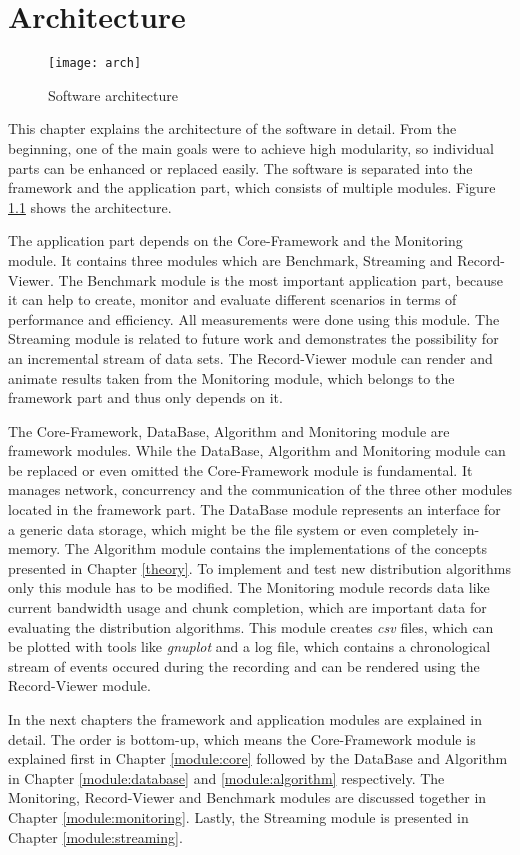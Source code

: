 \chapter{Architecture}
\label{architecture}

\begin{figure}[ht]
	\centering
	\texttt{[image: arch]}
	\caption{Software architecture}
	\label{fig:arch}
\end{figure}

This chapter explains the architecture of the software in detail. From the beginning, one of the main goals were to achieve high modularity, so individual parts can be enhanced or replaced easily. The software is separated into the framework and the application part, which consists of multiple modules. Figure \ref{fig:arch} shows the architecture. 

The application part depends on the Core-Framework and the Monitoring module. It contains three modules which are Benchmark, Streaming and Record-Viewer. The Benchmark module is the most important application part, because it can help to create, monitor and evaluate different scenarios in terms of performance and efficiency. All measurements were done using this module. The Streaming module is related to future work and demonstrates the possibility for an incremental stream of data sets. The Record-Viewer module can render and animate results taken from the Monitoring module, which belongs to the framework part and thus only depends on it.

The Core-Framework, DataBase, Algorithm and Monitoring module are framework modules. While the DataBase, Algorithm and Monitoring module can be replaced or even omitted the Core-Framework module is fundamental. It manages network, concurrency and the communication of the three other modules located in the framework part. The DataBase module represents an interface for a generic data storage, which might be the file system or even completely in-memory. The Algorithm module contains the implementations of the concepts presented in Chapter \ref{theory}. To implement and test new distribution algorithms only this module has to be modified. The Monitoring module records data like current bandwidth usage and chunk completion, which are important data for evaluating the distribution algorithms. This module creates \emph{csv} files, which can be plotted with tools like \emph{gnuplot} and a log file, which contains a chronological stream of events occured during the recording and can be rendered using the Record-Viewer module.

In the next chapters the framework and application modules are explained in detail. The order is bottom-up, which means the Core-Framework module is explained first in Chapter \ref{module:core} followed by the DataBase and Algorithm in Chapter \ref{module:database} and \ref{module:algorithm} respectively. The Monitoring, Record-Viewer and Benchmark modules are discussed together in Chapter \ref{module:monitoring}. Lastly, the Streaming module is presented in Chapter \ref{module:streaming}.